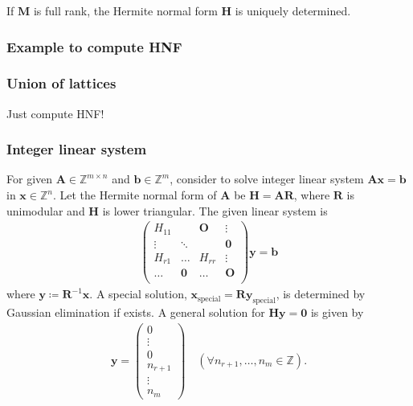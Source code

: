 If $\mathbf{M}$ is full rank, the Hermite normal form $\bm{H}$ is uniquely determined.

\subsubsection{Example to compute HNF}

\subsubsection{Union of lattices}

Just compute HNF!

\subsubsection{\label{sec:integer-linear-system}Integer linear system}

For given $\bm{A} \in \mathbb{Z}^{m \times n}$ and $\bm{b} \in \mathbb{Z}^{m}$, consider to solve integer linear system $\bm{Ax} = \bm{b}$ in $\bm{x} \in \mathbb{Z}^{n}$.
Let the Hermite normal form of $\bm{A}$ be $\bm{H} = \bm{AR}$, where $\bm{R}$ is unimodular and $\bm{H}$ is lower triangular.
The given linear system is
\begin{align}
  \begin{pmatrix}
    H_{11} &        & \bm{O} & \vdots     \\
    \vdots & \ddots &        & \bm{0} \\
    H_{r1} & \ldots & H_{rr} & \vdots     \\
    \ldots & \bm{0} & \ldots & \bm{O} \\
  \end{pmatrix}
  \bm{y} = \bm{b}
\end{align}
where $\mathbf{y} \coloneqq \bm{R}^{-1}\bm{x}$.
A special solution, $\bm{x}_{\mathrm{special}} = \bm{R}\bm{y}_{\mathrm{special}}$, is determined by Gaussian elimination if exists.
A general solution for $\bm{Hy}=\bm{0}$ is given by
\begin{align}
  \bm{y} = \begin{pmatrix} 0 \\ \vdots \\ 0 \\ n_{r+1} \\ \vdots \\ n_{m} \end{pmatrix}
        \quad (\forall n_{r+1},\dots, n_{m} \in \mathbb{Z}).
\end{align}

